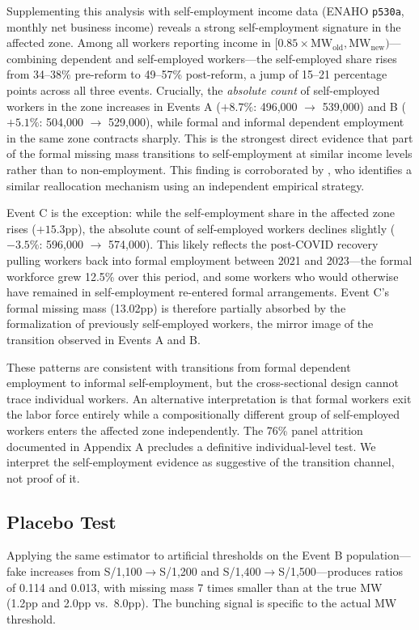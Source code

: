 \documentclass[12pt]{article}
\begin{document}
Supplementing this analysis with self-employment income data (ENAHO \texttt{p530a}, monthly net business income) reveals a strong self-employment signature in the affected zone. Among all workers reporting income in $[0.85 \times \text{MW}_\text{old}, \text{MW}_\text{new})$---combining dependent and self-employed workers---the self-employed share rises from 34--38\% pre-reform to 49--57\% post-reform, a jump of 15--21 percentage points across all three events. Crucially, the \textit{absolute count} of self-employed workers in the zone increases in Events A ($+8.7\%$: 496,000 $\to$ 539,000) and B ($+5.1\%$: 504,000 $\to$ 529,000), while formal and informal dependent employment in the same zone contracts sharply. This is the strongest direct evidence that part of the formal missing mass transitions to self-employment at similar income levels rather than to non-employment. This finding is corroborated by \citet{corcuera2024}, who identifies a similar reallocation mechanism using an independent empirical strategy.

Event C is the exception: while the self-employment share in the affected zone rises ($+15.3$pp), the absolute count of self-employed workers declines slightly ($-3.5\%$: 596,000 $\to$ 574,000). This likely reflects the post-COVID recovery pulling workers back into formal employment between 2021 and 2023---the formal workforce grew 12.5\% over this period, and some workers who would otherwise have remained in self-employment re-entered formal arrangements. Event C's formal missing mass (13.02pp) is therefore partially absorbed by the formalization of previously self-employed workers, the mirror image of the transition observed in Events A and B.

These patterns are consistent with transitions from formal dependent employment to informal self-employment, but the cross-sectional design cannot trace individual workers. An alternative interpretation is that formal workers exit the labor force entirely while a compositionally different group of self-employed workers enters the affected zone independently. The 76\% panel attrition documented in Appendix A precludes a definitive individual-level test. We interpret the self-employment evidence as suggestive of the transition channel, not proof of it.

\subsection{Placebo Test}

Applying the same estimator to artificial thresholds on the Event B population---fake increases from S/1,100$\to$S/1,200 and S/1,400$\to$S/1,500---produces ratios of 0.114 and 0.013, with missing mass 7 times smaller than at the true MW (1.2pp and 2.0pp vs.\ 8.0pp). The bunching signal is specific to the actual MW threshold.
\end{document}
